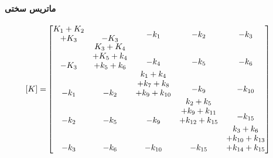 \paragraph{ماتریس سختی}
\begin{equation}\label{Eq.stiffness_matrix_dimensional_combined}
\begin{aligned}
[K] =& 
\begin{bmatrix}
\shortstack{$K_1 + K_2$ \\ $+ K_3$} & -K_3 & \shortstack{$-k_1$ \\ \,} & \shortstack{$-k_2$ \\ \,} & \shortstack{$-k_3$ \\ \,} \\
-K_3 & \shortstack{$K_3 + K_4$ \\ $+ K_5 + k_4$ \\ $+ k_5 + k_6$} & \shortstack{$-k_4$ \\ \,} & \shortstack{$-k_5$ \\ \,} & \shortstack{$-k_6$ \\ \,} \\
-k_1 & -k_2 & \shortstack{$k_1 + k_4$ \\ $+ k_7 + k_8$ \\ $+ k_9 + k_{10}$} & \shortstack{$-k_9$ \\ \,} & \shortstack{$-k_{10}$ \\ \,} \\
-k_2 & -k_5 & -k_9 & \shortstack{$k_2 + k_5$ \\ $+ k_9 + k_{11}$ \\ $+ k_{12} + k_{15}$} & \shortstack{$-k_{15}$ \\ \,} \\
-k_3 & -k_{6} & -k_{10} & -k_{15} & \shortstack{$k_3 + k_6$ \\ $+ k_{10} + k_{13}$ \\ $+ k_{14} + k_{15}$}
\end{bmatrix}
\end{aligned}
\end{equation}
